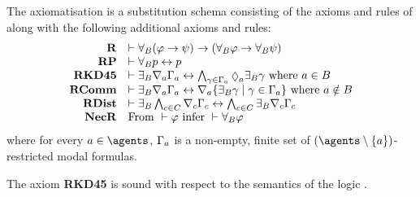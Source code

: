 \begin{definition}
    The axiomatisation \axiomRmlKD{} is a substitution schema consisting of the axioms and rules of \axiomKD{} along with the following additional axioms and rules:
$$
\begin{array}{rl}
    {\bf R} & \proves \allrefsBs (\phi \implies \psi) \implies (\allrefsBs \phi \implies \allrefsBs \psi)\\
    {\bf RP} & \proves \allrefsBs \atomP \iff \atomP\\
    {\bf RKD45} & \proves \somerefsBs \coversA \Gamma_\agentA \iff \bigwedge_{\gamma \in \Gamma_\agentA} \possibleA \somerefsBs \gamma \text{ where } \agentA \in \agentsB\\
    {\bf RComm} & \proves \somerefsBs \coversA \Gamma_\agentA \iff \coversA \{\somerefsBs \gamma \mid \gamma \in \Gamma_\agentA\} \text{ where } \agentA \notin \agentsB\\
    {\bf RDist} & \proves \somerefsBs \bigwedge_{\agentC \in \agentsC} \coversC \Gamma_\agentC \iff \bigwedge_{\agentC \in \agentsC} \somerefsBs \coversC \Gamma_\agentC\\
    {\bf NecR} & \text{From } \proves \phi \text{ infer } \proves \allrefsBs \phi
\end{array}
$$
where for every $\agentA \in \agents$, $\Gamma_a$ is a non-empty, finite set of $(\agents \setminus \{\agentA\})$-restricted modal formulas.
\end{definition}

\begin{lemma}
The axiom {\bf RKD45} is sound with respect to the semantics of the logic \logicRmlKD{}.
\end{lemma}

